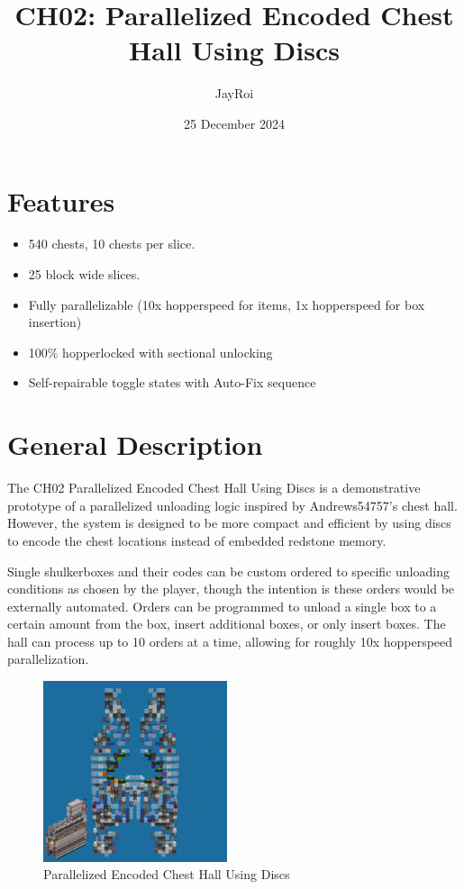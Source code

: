 \documentclass[10pt]{datasheet}
\title{CH02: Parallelized Encoded Chest Hall Using Discs}
\author{JayRoi}
\date{25 December 2024}
\begin{document}
\maketitle

\section{Features}
\begin{itemize}
\item{540 chests, 10 chests per slice.}
\item{25 block wide slices.}
\item{Fully parallelizable (10x hopperspeed for items, 1x hopperspeed for box insertion)}
\item{100\% hopperlocked with sectional unlocking}
\item{Self-repairable toggle states with Auto-Fix sequence}
\end{itemize}

\section{General Description}
The CH02 Parallelized Encoded Chest Hall Using Discs is a demonstrative prototype of a parallelized unloading logic inspired by Andrews54757's chest hall. However, the system is designed to be more compact and efficient by using discs to encode the chest locations instead of embedded redstone memory.

Single shulkerboxes and their codes can be custom ordered to specific unloading conditions as chosen by the player, though the intention is these orders would be externally automated. Orders can be programmed to unload a single box to a certain amount from the box, insert additional boxes, or only insert boxes. The hall can process up to 10 orders at a time, allowing for roughly 10x hopperspeed parallelization. 

\vfill\break

\begin{figure}[H]
    \centering
    \includegraphics[width=0.48\textwidth]{pic.png}
    \caption{\centering Parallelized Encoded Chest Hall Using Discs}
\end{figure}
\end{document}
